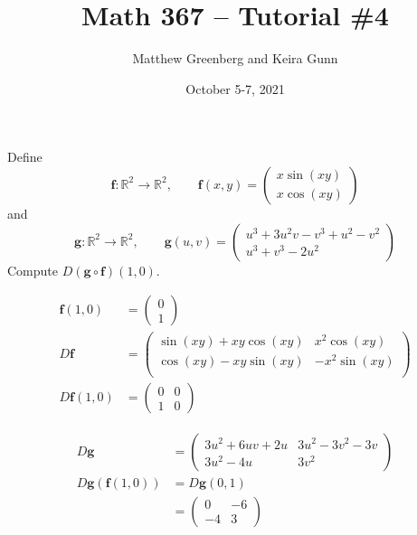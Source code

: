 \documentclass[answers]{exam}
\newcommand{\RR}{\mathbb{R}}
\newcommand{\vf}{\mathbf{f}}
\newcommand{\vg}{\mathbf{g}}
\begin{document}
\title{Math 367 -- Tutorial \#4}
\author{Matthew Greenberg and Keira Gunn}
\date{October 5-7, 2021}
\maketitle

\begin{questions}
    \setlength\itemsep{1em}
    \question Define
    \[
        \vf:\RR^2\to\RR^2,\qquad \vf(x,y)=\begin{pmatrix}
            x\sin(xy)\\x\cos(xy)
        \end{pmatrix}
    \]
    and
    \[
        \vg:\RR^2\to\RR^2,\qquad \vg(u,v)=\begin{pmatrix}
            u^3 + 3u^2v - v^3 + u^2 - v^2\\
            u^3 + v^3 - 2u^2
        \end{pmatrix}
    \]
    Compute $D(\vg\circ\vf)(1,0)$.

    \begin{solution}
        \begin{align*}
            \vf(1,0) &=\begin{pmatrix}
                0\\1
            \end{pmatrix}\\
            D\vf &= \begin{pmatrix}
                \sin(xy) + xy\cos(xy) & x^2\cos(xy)\\
                \cos(xy) - xy\sin(xy) & -x^2\sin(xy)\\
            \end{pmatrix}\\
            D\vf(1,0) &= \begin{pmatrix}
                0&0\\1&0
            \end{pmatrix}
        \end{align*}

        \begin{align*}
            D\vg &= \begin{pmatrix}
                3u^2 + 6uv + 2u&3u^2-3v^2-3v\\
                3u^2 - 4u&3v^2
            \end{pmatrix}\\
            D\vg(\vf(1,0)) &= D\vg(0,1)\\
            &=\begin{pmatrix}
                0&-6\\-4&3
            \end{pmatrix}
        \end{align*}


\end{solution}
\end{questions}
\end{document}
